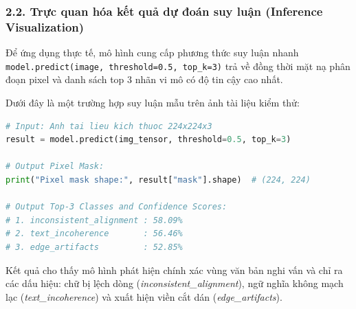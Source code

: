 \subsubsection{2.2. Trực quan hóa kết quả dự đoán suy luận (Inference Visualization)}
\indent\indent Để ứng dụng thực tế, mô hình cung cấp phương thức suy luận nhanh \texttt{model.predict(image, threshold=0.5, top\_k=3)} trả về đồng thời mặt nạ phân đoạn pixel và danh sách top 3 nhãn vi mô có độ tin cậy cao nhất.

Dưới đây là một trường hợp suy luận mẫu trên ảnh tài liệu kiểm thử:
\begin{lstlisting}[language=Python, frame=single, caption={Ví dụ kết quả suy luận từ phương thức predict}]
# Input: Anh tai lieu kich thuoc 224x224x3
result = model.predict(img_tensor, threshold=0.5, top_k=3)

# Output Pixel Mask:
print("Pixel mask shape:", result["mask"].shape)  # (224, 224)

# Output Top-3 Classes and Confidence Scores:
# 1. inconsistent_alignment : 58.09%
# 2. text_incoherence       : 56.46%
# 3. edge_artifacts         : 52.85%
\end{lstlisting}

Kết quả cho thấy mô hình phát hiện chính xác vùng văn bản nghi vấn và chỉ ra các dấu hiệu: chữ bị lệch dòng (\textit{inconsistent\_alignment}), ngữ nghĩa không mạch lạc (\textit{text\_incoherence}) và xuất hiện viền cắt dán (\textit{edge\_artifacts}).
